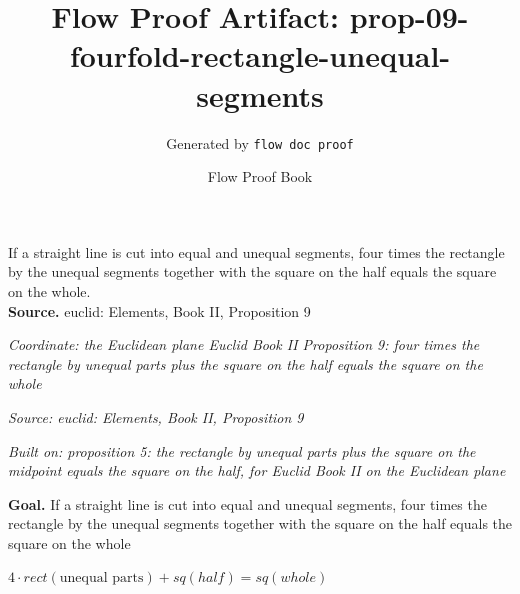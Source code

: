 \documentclass[11pt]{article}
\title{Flow Proof Artifact: prop-09-fourfold-rectangle-unequal-segments}
\author{Generated by \texttt{flow doc proof}}
\date{Flow Proof Book}
\theoremstyle{definition}
\begin{document}
\maketitle
If a straight line is cut into equal and unequal segments, four times the rectangle by the unequal segments together with the square on the half equals the square on the whole.\\[0.5em]
\textbf{Source.} euclid: Elements, Book II, Proposition 9\\[0.5em]
\bigskip
{}\par
\smallskip\noindent\textit{Coordinate: the Euclidean plane \cdot Euclid Book II \cdot Proposition 9: four times the rectangle by unequal parts plus the square on the half equals the square on the whole}\par
\smallskip\noindent\textit{Source: euclid: Elements, Book II, Proposition 9}\par
\smallskip\noindent\textit{Built on: proposition 5: the rectangle by unequal parts plus the square on the midpoint equals the square on the half, for Euclid Book II on the Euclidean plane}\par
\medskip
\noindent\textbf{Goal.} If a straight line is cut into equal and unequal segments, four times the rectangle by the unequal segments together with the square on the half equals the square on the whole\par
\noindent$\displaystyle 4 \cdot rect(\text{unequal parts}) + sq(half) = sq(whole)$\par
\medskip
\noindent
\end{document}
